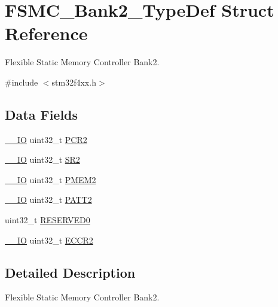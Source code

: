 \hypertarget{struct_f_s_m_c___bank2___type_def}{}\section{F\+S\+M\+C\+\_\+\+Bank2\+\_\+\+Type\+Def Struct Reference}
\label{struct_f_s_m_c___bank2___type_def}


Flexible Static Memory Controller Bank2.  




{\ttfamily \#include $<$stm32f4xx.\+h$>$}

\subsection*{Data Fields}
\begin{DoxyCompactItemize}
\item 
\hyperlink{group___c_m_s_i_s__core__definitions_gaec43007d9998a0a0e01faede4133d6be}{\+\_\+\+\_\+\+IO} uint32\+\_\+t \hyperlink{struct_f_s_m_c___bank2___type_def_ab0cb1d704ee64c62ad5be55522a2683a}{P\+C\+R2}
\item 
\hyperlink{group___c_m_s_i_s__core__definitions_gaec43007d9998a0a0e01faede4133d6be}{\+\_\+\+\_\+\+IO} uint32\+\_\+t \hyperlink{struct_f_s_m_c___bank2___type_def_a89623ee198737b29dc0a803310605a83}{S\+R2}
\item 
\hyperlink{group___c_m_s_i_s__core__definitions_gaec43007d9998a0a0e01faede4133d6be}{\+\_\+\+\_\+\+IO} uint32\+\_\+t \hyperlink{struct_f_s_m_c___bank2___type_def_a2e5a7a96de68a6612affa6df8c309c3d}{P\+M\+E\+M2}
\item 
\hyperlink{group___c_m_s_i_s__core__definitions_gaec43007d9998a0a0e01faede4133d6be}{\+\_\+\+\_\+\+IO} uint32\+\_\+t \hyperlink{struct_f_s_m_c___bank2___type_def_a9c1bc909ec5ed32df45444488ea6668b}{P\+A\+T\+T2}
\item 
uint32\+\_\+t \hyperlink{struct_f_s_m_c___bank2___type_def_af86c61a5d38a4fc9cef942a12744486b}{R\+E\+S\+E\+R\+V\+E\+D0}
\item 
\hyperlink{group___c_m_s_i_s__core__definitions_gaec43007d9998a0a0e01faede4133d6be}{\+\_\+\+\_\+\+IO} uint32\+\_\+t \hyperlink{struct_f_s_m_c___bank2___type_def_a05a47a1664adc7a3db3fa3e83fe883b4}{E\+C\+C\+R2}
\end{DoxyCompactItemize}


\subsection{Detailed Description}
Flexible Static Memory Controller Bank2. 

